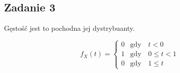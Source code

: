 \subsection{Zadanie 3}

Gęstość jest to pochodna jej dystrybuanty.

$$
f_X(t) = \left\{
\begin{array}{ll}
0 & \text{gdy} \quad t < 0\\
1 & \text{gdy} \quad 0 \leq t < 1\\
0 & \text{gdy} \quad 1 \leq t
\end{array}
\right.
$$